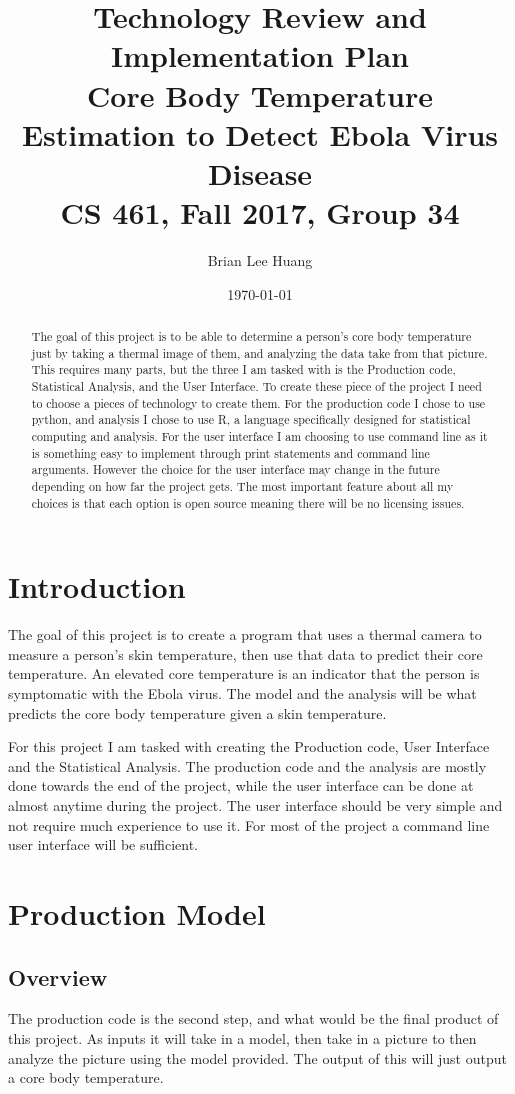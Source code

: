 \documentclass[10pt, draftclsnofoot, onecolumn]{IEEEtran}
\title{%
  Technology Review and Implementation Plan \\
  \vspace{0.4cm}
  \large Core Body Temperature Estimation to Detect Ebola Virus Disease \\
  \vspace{0.4cm}
  \large CS 461, Fall 2017, Group 34\\
    }
\author{Brian Lee Huang}
\date{\today}
\begin{document}
\maketitle

\begin{abstract}
The goal of this project is to be able to determine a person’s core body temperature just by taking a thermal image of them, and analyzing the data take from that picture. This requires many parts, but the three I am tasked with is the Production code, Statistical Analysis, and the User Interface. To create these piece of the project I need to choose a pieces of technology to create them. For the production code I chose to use python, and analysis I chose to use R, a language specifically designed for statistical computing and analysis. For the user interface I am choosing to use command line as it is something easy to implement through print statements and command line arguments. However the choice for the user interface may change in the future depending on how far the project gets. The most important feature about all my choices is that each option is open source meaning there will be no licensing issues.
\end{abstract}

\newpage
\section{Introduction}
The goal of this project is to create a program that uses a thermal camera to measure a person's skin temperature, then use that data to predict their core temperature. An elevated core temperature is an indicator that the person is symptomatic with the Ebola virus. The model and the analysis will be what predicts the core body temperature given a skin temperature.

For this project I am tasked with creating the Production code, User Interface and the Statistical Analysis. The production code and the analysis are mostly done towards the end of the project, while the user interface can be done at almost anytime during the project. The user interface should be very simple and not require much experience to use it. For most of the project a command line user interface will be sufficient.

\section{Production Model}
	\subsection{Overview}
	The production code is the second step, and what would be the final product of this project. As inputs it will take in a model, then take in a picture to then analyze the picture using the model provided. The output of this will just output a core body temperature.
\end{document}
